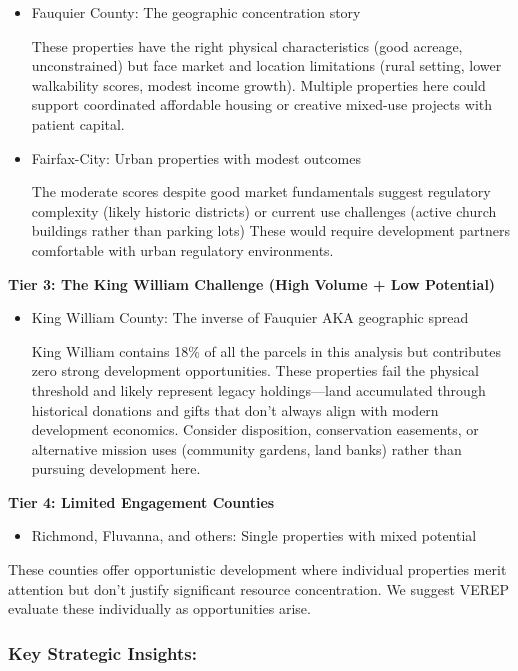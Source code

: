 \documentclass[
  letterpaper,
  DIV=11,
  numbers=noendperiod,
  oneside]{scrreprt}
\providecommand{\tightlist}{%
  \setlength{\itemsep}{0pt}\setlength{\parskip}{0pt}}
\begin{document}
\begin{itemize}
\item
  Fauquier County: The geographic concentration story

  These properties have the right physical characteristics (good
  acreage, unconstrained) but face market and location limitations
  (rural setting, lower walkability scores, modest income growth).
  Multiple properties here could support coordinated affordable housing
  or creative mixed-use projects with patient capital.
\item
  Fairfax-City: Urban properties with modest outcomes

  The moderate scores despite good market fundamentals suggest
  regulatory complexity (likely historic districts) or current use
  challenges (active church buildings rather than parking lots) These
  would require development partners comfortable with urban regulatory
  environments.
\end{itemize}

\textbf{Tier 3: The King William Challenge (High Volume + Low
Potential)}

\begin{itemize}
\item
  King William County: The inverse of Fauquier AKA geographic spread

  King William contains 18\% of all the parcels in this analysis but
  contributes zero strong development opportunities. These properties
  fail the physical threshold and likely represent legacy
  holdings---land accumulated through historical donations and gifts
  that don't always align with modern development economics. Consider
  disposition, conservation easements, or alternative mission uses
  (community gardens, land banks) rather than pursuing development here.
\end{itemize}

\textbf{Tier 4: Limited Engagement Counties}

\begin{itemize}
\tightlist
\item
  Richmond, Fluvanna, and others: Single properties with mixed potential
\end{itemize}

These counties offer opportunistic development where individual
properties merit attention but don't justify significant resource
concentration. We suggest VEREP evaluate these individually as
opportunities arise.

\subsubsection{Key Strategic Insights:}\label{key-strategic-insights}
\end{document}
